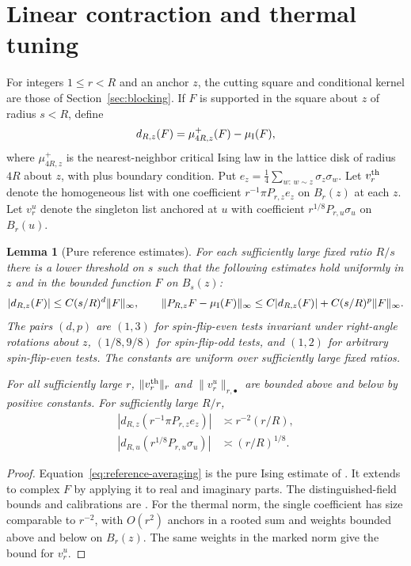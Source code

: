\documentclass[11pt]{article}
\newtheorem{lemma}[proposition]{Lemma}
\theoremstyle{definition}
\begin{document}
\section{Linear contraction and thermal tuning}
\label{sec:tuning}

For integers \(1\le r<R\) and an anchor \(z\), the cutting square
and conditional kernel are those of Section~\ref{sec:blocking}.
If \(F\) is supported in the square about \(z\) of radius \(s<R\), define
\[
 d_{R,z}(F)=\mu^+_{4R,z}(F)-\mu_{\rm I}(F),
\]
where \(\mu^+_{4R,z}\) is the nearest-neighbor critical Ising law in
the lattice disk of radius \(4R\) about \(z\), with plus boundary
condition. Put \(e_z=\frac14\sum_{w:\,w\sim z}\sigma_z\sigma_w\).
Let \(v_r^{\rm th}\) denote the homogeneous list with one coefficient
\(r^{-1}\pi P_{r,z}e_z\) on \(B_r(z)\) at each \(z\). Let \(v_r^u\)
denote the singleton list anchored at \(u\) with coefficient
\(r^{1/8}P_{r,u}\sigma_u\) on \(B_r(u)\).

\begin{lemma}[Pure reference estimates]\label{lem:pure-reference}
For each sufficiently large fixed ratio \(R/s\) there is a lower
threshold on \(s\) such that the following estimates hold uniformly
in \(z\) and in the bounded function \(F\) on \(B_s(z)\):
\begin{equation}
 |d_{R,z}(F)|\le C(s/R)^d\|F\|_\infty,\qquad
 \|P_{R,z}F-\mu_{\rm I}(F)\|_\infty
   \le C|d_{R,z}(F)|+C(s/R)^p\|F\|_\infty .
 \label{eq:reference-averaging}
\end{equation}
The pairs \((d,p)\) are \((1,3)\) for spin-flip-even tests invariant
under right-angle rotations about \(z\), \((1/8,9/8)\) for
spin-flip-odd tests, and \((1,2)\) for arbitrary spin-flip-even tests.
The constants are uniform over sufficiently large fixed ratios.

For all sufficiently large \(r\), \(\|v_r^{\rm th}\|_r\) and
\(\|v_r^u\|_{r,\bullet}\) are bounded above and below by positive
constants. For sufficiently large \(R/r\),
\begin{align}
 |d_{R,z}(r^{-1}\pi P_{r,z}e_z)|
   &\asymp r^{-2}(r/R), \label{eq:thermal-calibration}\\
 |d_{R,u}(r^{1/8}P_{r,u}\sigma_u)|
   &\asymp (r/R)^{1/8}. \label{eq:spin-calibration}
\end{align}
\end{lemma}

\begin{proof}
Equation~\eqref{eq:reference-averaging} is the pure Ising estimate of
\cite[Proposition 4.1]{BulkIsingRadialRG}. It extends to complex \(F\)
by applying it to real and imaginary parts. The distinguished-field
bounds and calibrations are \cite[Lemma 5.3]{BulkIsingRadialRG}.
For the thermal norm, the single coefficient has size comparable
to \(r^{-2}\), with \(O(r^2)\) anchors in a rooted sum and weights
bounded above and below on \(B_r(z)\). The same weights in the
marked norm give the bound for \(v_r^u\).
\end{proof}
\end{document}
